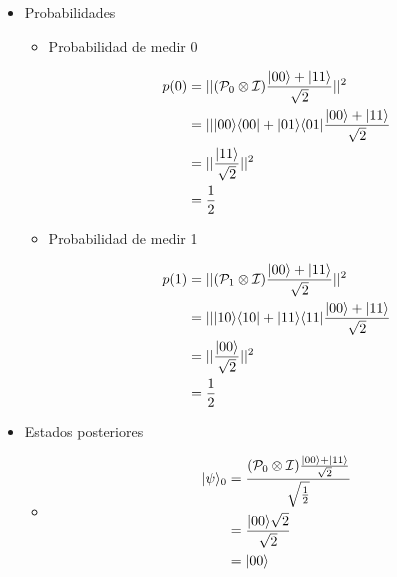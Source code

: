 \documentclass[osajnl,preprint,showpacs,superscriptaddress,10pt]{revtex4-1} %
\DeclarePairedDelimiter\bra{\langle}{\rvert}
\DeclarePairedDelimiter\ket{\lvert}{\rangle}
\begin{document}
\begin{itemize}
    \item Probabilidades
    
    \begin{itemize}
        \item Probabilidad de medir 0
        
        \begin{fleqn}[\parindent]
        \begin{equation}
        \begin{split}
            p(0)
                &= || (\mathcal{P}_0 \tens \mathcal{I}) \frac{\ket{00} + \ket{11}}{\sqrt{2}} ||^2 \\
                &= || \ket{00}\bra{00} + \ket{01}\bra{01} \frac{\ket{00} + \ket{11}}{\sqrt{2}} \\
                &= || \frac{\ket{11}}{\sqrt{2}} ||^2 \\
                &= \frac{1}{2}
        \end{split}
        \end{equation}
        \end{fleqn}
        
        \item Probabilidad de medir 1
        
        \begin{fleqn}[\parindent]
        \begin{equation}
        \begin{split}
            p(1)
                &= || (\mathcal{P}_1 \tens \mathcal{I}) \frac{\ket{00} + \ket{11}}{\sqrt{2}} ||^2 \\
                &= || \ket{10}\bra{10} + \ket{11}\bra{11} \frac{\ket{00} + \ket{11}}{\sqrt{2}} \\
                &= || \frac{\ket{00}}{\sqrt{2}} ||^2 \\
                &= \frac{1}{2}
        \end{split}
        \end{equation}
        \end{fleqn}
    \end{itemize}
    
    \item Estados posteriores
    
    \begin{itemize}
        \item \begin{fleqn}[\parindent]
        \begin{equation}
        \begin{split}
            \ket{\psi}_0
                &= \frac{(\mathcal{P}_0 \tens \mathcal{I}) \frac{\ket{00} + \ket{11}}{\sqrt{2}}}{\sqrt{\frac{1}{2}}} \\
                &= \frac{\ket{00}\sqrt{2}}{\sqrt{2}} \\
                &= \ket{00}
        \end{split}
        \end{equation}
        \end{fleqn}
        

\end{itemize}
\end{itemize}
\end{document}
